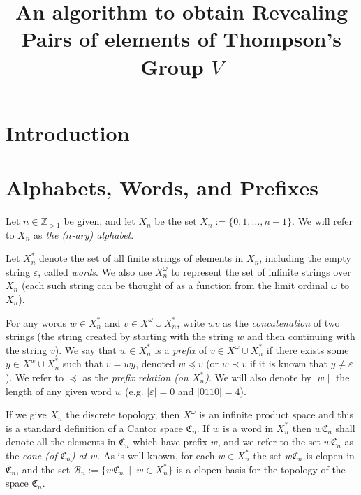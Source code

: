 \documentclass[12pt]{amsart}
\title[]{An algorithm to obtain Revealing Pairs of elements of Thompson's Group $V$}
\author{}
\newcommand{\seteq}{:=}
\newcommand{\Z}{\mathbb{Z}}
\newcommand{\xn}{X_n}
\newcommand{\xns}{X_n^*}
\newcommand{\Cn}{\mathfrak{C}_n}
\newcommand{\xnomega}{X_n^{\omega}}
\begin{document}
\maketitle
\vspace{.2 in}


\tableofcontents

\section{Introduction}

    \section{Alphabets, Words, and Prefixes}
        
                Let $n\in \Z_{>1}$ be given, and let $X_n$ be the set $X_n:=\{0,1,\ldots, n-1\}$.  We will refer to $X_n$ as \textit{the ($n$-ary) alphabet}.

   Let $\xns$ denote the set of all finite strings of elements in $\xn$, including the empty string $\varepsilon$, called \textit{words}. We also use $\xnomega$ to represent the set of infinite strings over $\xn$ (each such string can be thought of as a function from the limit ordinal $\omega$ to $\xn$).
        
        For any words $ w  \in \xns$ and $ v  \in X^\omega \cup \xns$, write $ w   v $ as the \textit{concatenation} of two strings (the string created by starting with the string $w$ and then continuing with the string $v$). We say that $ w  \in \xns$ is a \textit{prefix} of $ v  \in X^\omega  \cup \xns$ if there exists some $y \in X^ w  \cup \xns$ such that $ v  =  w y$, denoted $ w  \preceq  v $ (or $ w  \prec  v $ if it is known that $y \neq \varepsilon$).  We refer to $\preceq$ as the \textit{prefix relation (on $\xns$)}.  We will also denote by $\mid w \mid$ the length of any given word $ w $ (e.g. $\mid\varepsilon\mid=0$ and $\mid0110\mid=4$).
        
         If we give $\xn$ the discrete topology, then $X^\omega $ is an infinite product space and this is a standard definition of a Cantor space $\Cn$. If $w$ is a word in $\xns$ then $w\Cn$ shall denote all the elements in $\Cn$ which have prefix $w$, and we refer to the set $w\Cn$ as the \emph{cone (of $\Cn$) at $w$}.  As is well known, for each $w\in \xns$ the set $w\Cn$ is clopen in $\Cn$, and the set $\mathscr{B}_n\seteq\{w\Cn\ \mid\ w\in \xns\}$ is a clopen basis for the topology of the space $\Cn$.
        
\end{document}
